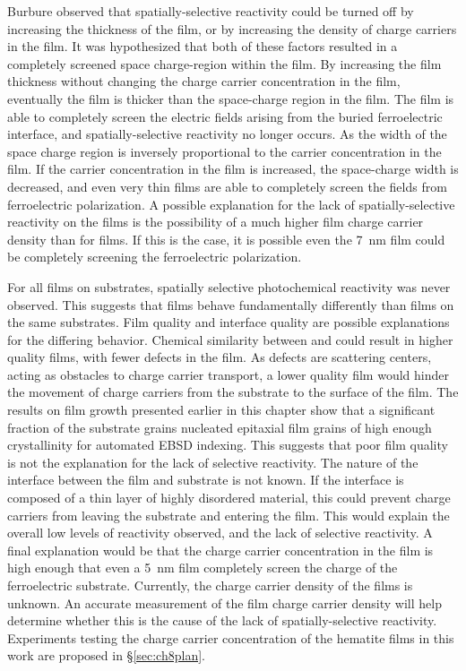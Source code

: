Burbure observed that spatially-selective reactivity could be turned off by increasing the thickness of the film, or by increasing the density of charge carriers in the film. It was hypothesized that both of these factors resulted in a completely screened space charge-region within the film. By increasing the film thickness without changing the charge carrier concentration in the film, eventually the film is thicker than the space-charge region in the film. The film is able to completely screen the electric fields arising from the buried ferroelectric interface, and spatially-selective reactivity no longer occurs. As the width of the space charge region is inversely proportional to the carrier concentration in the film. If the carrier concentration in the film is increased, the space-charge width is decreased, and even very thin films are able to completely screen the fields from ferroelectric polarization. A possible explanation for the lack of spatially-selective reactivity on the  films is the possibility of a much higher film charge carrier density than for  films. If this is the case, it is possible even the \SI{7}{\nano\meter}  film could be completely screening the ferroelectric polarization. 

For all  films on  substrates, spatially selective photochemical reactivity was never observed. This suggests that  films behave fundamentally differently than  films on the same substrates. Film quality and interface quality are possible explanations for the differing behavior. Chemical similarity between  and  could result in higher quality films, with fewer defects in the film. As defects are scattering centers, acting as obstacles to charge carrier transport, a lower quality film would hinder the movement of charge carriers from the substrate to the surface of the film. The results on  film growth presented earlier in this chapter show that a significant fraction of the substrate grains nucleated epitaxial film grains of high enough crystallinity for automated EBSD indexing. This suggests that poor film quality is not the explanation for the lack of selective reactivity. The nature of the interface between the film and substrate is not known. If the interface is composed of a thin layer of highly disordered material, this could prevent charge carriers from leaving the substrate and entering the film. This would explain the overall low levels of reactivity observed, and the lack of selective reactivity. A final explanation would be that the charge carrier concentration in the film is high enough that even a \SI{5}{\nano\meter} film completely screen the charge of the ferroelectric substrate. Currently, the charge carrier density of the  films is unknown. An accurate measurement of the film charge carrier density will help determine whether this is the cause of the lack of spatially-selective reactivity. Experiments testing the charge carrier concentration of the hematite films in this work are proposed in \S \ref{sec:ch8plan}.


